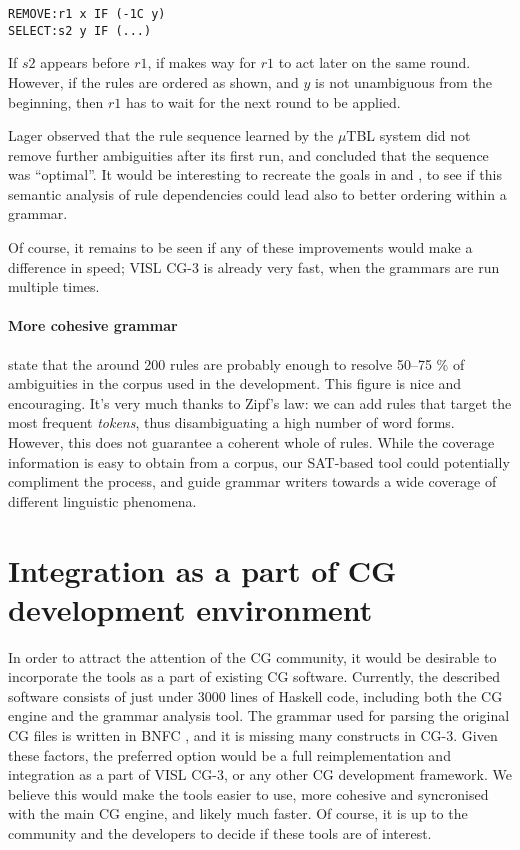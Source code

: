 {{\begin{verbatim}
REMOVE:r1 x IF (-1C y)
SELECT:s2 y IF (...)
\end{verbatim}

If $s2$ appears before $r1$, if makes way for $r1$ to act later on the same round. 
However, if the rules are ordered as shown, and $y$ is not unambiguous from the beginning, then $r1$ has to wait for the next round to be applied.



Lager \cite{lager01transformation} observed that the rule sequence learned by the $\mu$TBL system did not remove further ambiguities after its first run, and concluded that the sequence was ``optimal''. 
It would be interesting to recreate the goals in \cite{lager01transformation} and \cite{bick2013tuning}, to see if this semantic analysis of rule dependencies could lead also to better ordering within a grammar.

Of course, it remains to be seen if any of these improvements would make a difference in speed; VISL CG-3 is already very fast, when the grammars are run multiple times.

\paragraph{More cohesive grammar} \cite{voutilainen2004} state that the around 200 rules are probably enough to resolve 50--75 \% of ambiguities in the corpus used in the development. 
This figure is nice and encouraging. It's very much thanks to Zipf's law: we can add rules that target the most frequent \emph{tokens}, thus disambiguating a high number of word forms. However, this does not guarantee a coherent whole of rules. 
While the coverage information is easy to obtain from a corpus, our SAT-based tool could potentially compliment the process, and guide grammar writers towards a wide coverage of different linguistic phenomena.

\section{Integration as a part of CG development environment}

In order to attract the attention of the CG community, it would be desirable to incorporate the tools as a part of existing CG software. 
Currently, the described software consists of just under 3000 lines of Haskell code, including both the CG engine and the grammar analysis tool.
The grammar used for parsing the original CG files is written in BNFC , and it is missing many constructs in CG-3. 
Given these factors, the preferred option would be a full reimplementation and integration as a part of VISL CG-3, or any other CG development framework. We believe this would make the tools easier to use, more cohesive and syncronised with the main CG engine, and likely much faster. Of course, it is up to the community and the developers to decide if these tools are of interest.







}}
